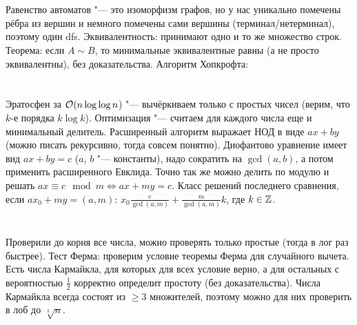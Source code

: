 \section{} %
Равенство автоматов "--- это изоморфизм графов, но у нас уникально помечены рёбра из вершин и немного помечены сами вершины (терминал/нетерминал), поэтому один dfs.
Эквивалентность: принимают одно и то же множество строк.
Теорема: если $A \sim B$, то минимальные эквивалентные равны (а не просто эквивалентны), без доказательства.
Алгоритм Хопкрофта: \TODO

\section{} %
\TODO

\section{} %
\TODO

\section{} %
\TODO

\section{} %
Эратосфен за $\mathcal{O}(n \log \log n$) "--- вычёркиваем только с простых чисел (верим, что $k$-е порядка $k \log k$).
Оптимизация "--- считаем для каждого числа еще и минимальный делитель.
Расширенный алгоритм выражает НОД в виде $ax+by$ (можно писать рекурсивно, тогда совсем понятно).
Диофантово уравнение имеет вид $ax+by=c$ ($a$, $b$ "--- константы), надо сократить на $\gcd(a, b)$, а потом применить расширенного Евклида.
Точно так же можно делить по модулю и решать $ax\equiv c \mod m \iff ax+my = c$.
Класс решений последнего сравнения, если $ax_0 + my = (a, m)$: $x_0 \frac{c}{\gcd(a, m)} + \frac{m}{\gcd(a, m)}k$, где $k \in \mathbb{Z}$.

\section{} %
Проверили до корня все числа, можно проверять только простые (тогда в лог раз быстрее).
Тест Ферма: проверим условие теоремы Ферма для случайного вычета.
Есть числа Кармайкла, для которых для всех условие верно, а для остальных с вероятностью $\frac 12$ корректно определит простоту (без доказательства).
Числа Кармайкла всегда состоят из $\ge 3$ множителей, поэтому можно для них проверить в лоб до $\sqrt[3]n$.

